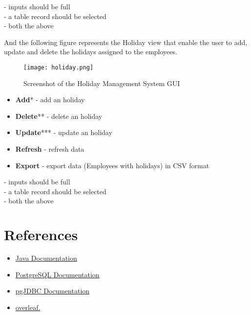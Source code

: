 \documentclass[12pt]{article}
\begin{document}
\noindent \text{*} - inputs should be full\\
\text{**} - a table record should be selected\\
\text{***} - both the above

\pagebreak

And the following figure represents the Holiday view that enable
the user to add, update and delete the holidays assigned to the
employees.

\begin{figure}[H]
  \centering
  \texttt{[image: holiday.png]}
  \caption{Screenshot of the Holiday Management System GUI}
\end{figure}

\begin{itemize}
    \item \textbf{Add}* - add an holiday
    \item \textbf{Delete}** - delete an holiday
	\item \textbf{Update}*** - update an holiday
    \item \textbf{Refresh} - refresh data
    \item  \textbf{Export} - export data (Employees with holidays) in CSV format
\end{itemize}

\noindent \text{*} - inputs should be full\\
\text{**} - a table record should be selected\\
\text{***} - both the above

\pagebreak

\section{References}
\begin{itemize}
    \item \href{https://docs.oracle.com/en/java/}{Java Documentation}
    \item \href{https://www.postgresql.org/docs/}{PostgreSQL Documentation}
    \item \href{https://jdbc.postgresql.org/documentation/}{pgJDBC Documentation}
    \item \href{https://www.overleaf.com/}{overleaf. }
\end{itemize}
\end{document}
